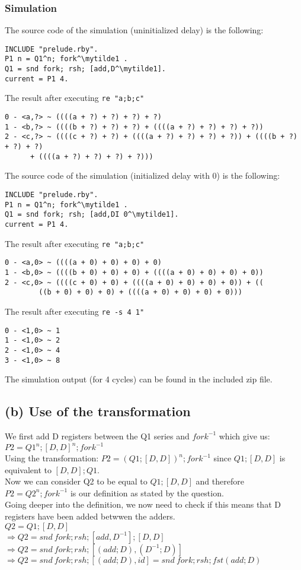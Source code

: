 \documentclass[a4paper,10pt]{article}
\newcommand{\mytilde}{$\sim$}
\begin{document}
\subsubsection*{Simulation}
The source code of the simulation (uninitialized delay) is the following:
\begin{Verbatim}[commandchars=\\\{\}]
INCLUDE "prelude.rby".
P1 n = Q1^n; fork^\mytilde1 .
Q1 = snd fork; rsh; [add,D^\mytilde1].
current = P1 4.
\end{Verbatim}
The result after executing \verb|re "a;b;c"|
\begin{Verbatim}[commandchars=\\\{\}]
0 - <a,?> ~ ((((a + ?) + ?) + ?) + ?)
1 - <b,?> ~ ((((b + ?) + ?) + ?) + ((((a + ?) + ?) + ?) + ?))
2 - <c,?> ~ ((((c + ?) + ?) + ((((a + ?) + ?) + ?) + ?)) + ((((b + ?) + ?) + ?) 
	  + ((((a + ?) + ?) + ?) + ?)))
\end{Verbatim}
The source code of the simulation (initialized delay with 0) is the following:
\begin{Verbatim}[commandchars=\\\{\}]
INCLUDE "prelude.rby".
P1 n = Q1^n; fork^\mytilde1 .
Q1 = snd fork; rsh; [add,DI 0^\mytilde1].
current = P1 4.
\end{Verbatim}
The result after executing \verb|re "a;b;c"|
\begin{Verbatim}[commandchars=\\\{\}]
0 - <a,0> ~ ((((a + 0) + 0) + 0) + 0)
1 - <b,0> ~ ((((b + 0) + 0) + 0) + ((((a + 0) + 0) + 0) + 0))
2 - <c,0> ~ ((((c + 0) + 0) + ((((a + 0) + 0) + 0) + 0)) + ((
	    ((b + 0) + 0) + 0) + ((((a + 0) + 0) + 0) + 0)))
\end{Verbatim}
The result after executing \verb|re -s 4 1"|
\begin{Verbatim}[commandchars=\\\{\}]
0 - <1,0> ~ 1
1 - <1,0> ~ 2
2 - <1,0> ~ 4
3 - <1,0> ~ 8
\end{Verbatim}
The simulation output (for 4 cycles) can be found in the included zip file.
\subsection*{(b) Use of the transformation}
We first add D registers between the Q1 series and $fork^{-1}$ which give us: $P2=Q1^n;[D,D]^n;fork^{-1}$\\[0.25cm] 
Using the transformation: $P2=(Q1;[D,D])^n;fork^{-1}$ since $Q1;[D,D]$ is equivalent to $[D,D];Q1$.\\[0.25cm] 
Now we can consider Q2 to be equal to $Q1;[D,D]$ and therefore $P2 = Q2^n;fork^{-1}$ is our definition as stated by the question.\\[0.25cm] 
Going deeper into the definition, we now need to check if this means that D registers have been added betwwen the adders. \\[0.25cm] 
$Q2 = Q1;[D,D] $\\[0.25cm]
$\Rightarrow Q2 = snd\: fork;rsh;[add,D^{-1}];[D,D]$ \\[0.25cm]
$\Rightarrow Q2 = snd\: fork;rsh;[(add;D),(D^{-1};D)] $ \\[0.25cm]
$\Rightarrow Q2 = snd\: fork;rsh;[(add;D),id] = snd\: fork;rsh;fst(add;D)$
\end{document}
